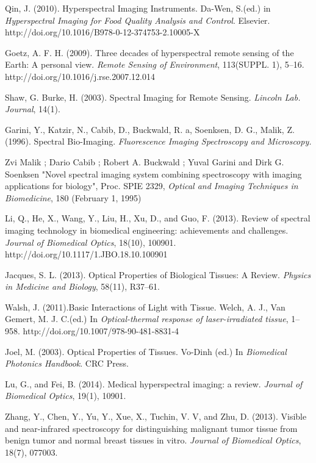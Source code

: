 \documentclass[a4paper]{article}
\begin{document}
\begin{thebibliography}{9}

 Qin, J. (2010). Hyperspectral Imaging Instruments. Da-Wen, S.(ed.) in \emph{Hyperspectral Imaging for Food Quality Analysis and Control}. Elsevier. http://doi.org/10.1016/B978-0-12-374753-2.10005-X

 Goetz, A. F. H. (2009). Three decades of hyperspectral remote sensing of the Earth: A personal view. \emph{Remote Sensing of Environment}, 113(SUPPL. 1), 5–16. http://doi.org/10.1016/j.rse.2007.12.014

 Shaw, G. Burke, H. (2003). Spectral Imaging for Remote Sensing. \emph{Lincoln Lab. Journal}, 14(1). 

 Garini, Y., Katzir, N., Cabib, D., Buckwald, R. a, Soenksen, D. G., Malik, Z. (1996). Spectral Bio-Imaging. \emph{Fluorescence Imaging Spectroscopy and Microscopy.}  

 Zvi Malik ; Dario Cabib ; Robert A. Buckwald ; Yuval Garini and Dirk G. Soenksen "Novel spectral imaging system combining spectroscopy with imaging applications for biology", Proc. SPIE 2329, \emph{Optical and Imaging Techniques in Biomedicine}, 180 (February 1, 1995)

 Li, Q., He, X., Wang, Y., Liu, H., Xu, D., and Guo, F. (2013). Review of spectral imaging technology in biomedical engineering: achievements and challenges. \emph{Journal of Biomedical Optics}, 18(10), 100901. http://doi.org/10.1117/1.JBO.18.10.100901

 Jacques, S. L. (2013). Optical Properties of Biological Tissues: A Review. \emph{Physics in Medicine and Biology}, 58(11), R37–61. 

 Walsh, J. (2011).Basic Interactions of Light with Tissue. Welch, A. J.,  Van Gemert, M. J. C.(ed.) In \emph{Optical-thermal response of laser-irradiated tissue}, 1–958. http://doi.org/10.1007/978-90-481-8831-4

 Joel, M. (2003). Optical Properties of Tissues. Vo-Dinh (ed.) In \emph{Biomedical Photonics Handbook}. CRC Press. 

 Lu, G., and Fei, B. (2014). Medical hyperspectral imaging: a review. \emph{Journal of Biomedical Optics}, 19(1), 10901. 

 Zhang, Y., Chen, Y., Yu, Y., Xue, X., Tuchin, V. V, and Zhu, D. (2013). Visible and near-infrared spectroscopy for distinguishing malignant tumor tissue from benign tumor and normal breast tissues in vitro. \emph{Journal of Biomedical Optics}, 18(7), 077003. 


\end{thebibliography}
\end{document}
